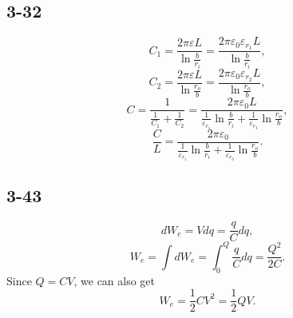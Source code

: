 \documentclass[6pt,a4paper]{article}
\begin{document}
\subsection{3-32}
$$C_1=\frac{2\pi\varepsilon L}{\ln\frac{b}{r_i}}=\frac{2\pi\varepsilon_0\varepsilon_{r_1}L}{\ln\frac{b}{r_i}},$$
$$C_2=\frac{2\pi\varepsilon L}{\ln\frac{r_o}{b}}=\frac{2\pi\varepsilon_0\varepsilon_{r_2}L}{\ln\frac{r_o}{b}},$$
$$C=\frac{1}{\frac{1}{C_1}+\frac{1}{C_2}}=\frac{2\pi\varepsilon_0L}{\frac{1}{\varepsilon_{r_1}}\ln\frac{b}{r_i}+\frac{1}{\varepsilon_{r_3}}\ln\frac{r_o	}{b}},$$
$$\frac{C}{L}=\frac{2\pi\varepsilon_0}{\frac{1}{\varepsilon_{r_1}}\ln\frac{b}{r_i}+\frac{1}{\varepsilon_{r_3}}\ln\frac{r_o}{b}}.$$

\subsection{3-43}
$$dW_e=Vdq=\frac{q}{C}dq,$$
$$W_e=\int dW_e=\int_0^Q \frac{q}{C}dq=\frac{Q^2}{2C}.$$
Since $Q=CV$, we can also get
$$W_e=\frac{1}{2}CV^2=\frac{1}{2}QV.$$
\end{document}
